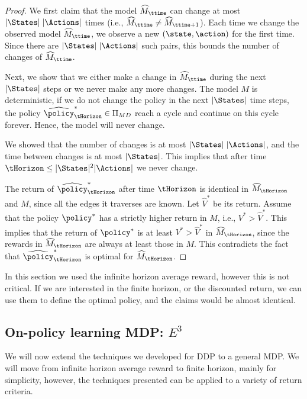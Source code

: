 \begin{proof}
We first claim that the model $\widehat{M}_\ttime$ can change  at
most $|\States|\;|\Actions|$ times (i.e.,  $\widehat{M}_\ttime \neq
\widehat{M}_{\ttime+1}$). Each time we change the observed model
$\widehat{M}_\ttime$, we observe a new $(\state,\action)$ for the
first time. Since there are $|\States|\;|\Actions|$ such pairs, this
bounds the number of changes of  $\widehat{M}_\ttime$.

Next, we show that we either make a change in $\widehat{M}_\ttime$
during the next $|\States|$ steps or we never make any more changes.
The model $M$ is deterministic, if we do not change the policy in
the next $|\States|$ time steps, the policy
$\widehat{\policy}^*_\tHorizon \in {\Pi _{MD}}$ reach a cycle and
continue on this cycle forever. Hence, the model will never change.

We showed that the number of changes is at most
$|\States|\;|\Actions|$, and the time between changes is at most
$|\States|$. This implies that after time $\tHorizon\leq
|\States|^2|\Actions|$ we never change.

The return of $\widehat{\policy}^*_\tHorizon$ after time $\tHorizon$
is identical in $\widehat{M}_\tHorizon$ and $M$, since all the edges
it traverses are known. Let $\widehat{V}^*$ be its return. Assume
that the policy $\policy^*$ has a strictly higher return in $M$,
i.e., $V^*>\widehat{V}^*$. This implies that the return of
$\policy^*$ is at least $V^*>\widehat{V}^*$ in
$\widehat{M}_\tHorizon$, since the rewards in
$\widehat{M}_\tHorizon$ are always at least those in $M$. This
contradicts the fact that $\widehat{\policy}^*_\tHorizon$ is optimal
for $\widehat{M}_\tHorizon$.
\end{proof}

In this section we used the infinite horizon average reward, however
this is not critical. If we are interested in the finite horizon, or
the discounted return, we can use them to define the optimal policy,
and the claims would be almost identical.


\subsection{On-policy learning MDP: $E^3$}

We will now extend the techniques we developed for DDP to a general
MDP. We will move from infinite horizon average reward to finite
horizon, mainly for simplicity, however, the techniques presented
can be applied to a variety of return criteria.


